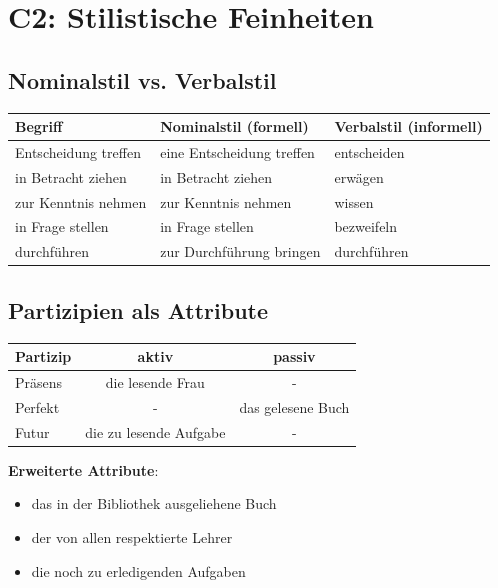 \chapterend

\chapter{C2: Stilistische Feinheiten}
\label{cha:C2Stil}

\section{Nominalstil vs. Verbalstil}
\label{sec:C2Nominalverbal}

\bigskip
\begin{center}
\begin{tabular}{|l|l|l|}
\hline
Begriff & Nominalstil (formell) & Verbalstil (informell) \\ \hline
Entscheidung treffen & eine Entscheidung treffen & entscheiden \\ \hline
in Betracht ziehen & in Betracht ziehen & erwägen \\ \hline
zur Kenntnis nehmen & zur Kenntnis nehmen & wissen \\ \hline
in Frage stellen & in Frage stellen & bezweifeln \\ \hline
durchführen & zur Durchführung bringen & durchführen \\ \hline
\end{tabular}
\end{center}

\section{Partizipien als Attribute}
\label{sec:C2PartizipAttribute}

\bigskip
\begin{center}
\begin{tabular}{|l|c|c|}
\hline
Partizip & aktiv & passiv \\ \hline
Präsens & die lesende Frau & - \\ \hline
Perfekt & - & das gelesene Buch \\ \hline
Futur & die zu lesende Aufgabe & - \\ \hline
\end{tabular}
\end{center}

\bigskip
\textbf{Erweiterte Attribute}:
\begin{itemize}
    \item das in der Bibliothek ausgeliehene Buch
    \item der von allen respektierte Lehrer
    \item die noch zu erledigenden Aufgaben
\end{itemize}

